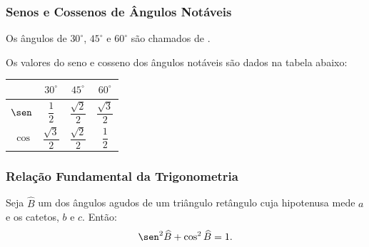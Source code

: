 
\begin{frame}
\frametitle{Senos e Cossenos de Ângulos Notáveis} 

\begin{definicao}
	Os ângulos de $30^\circ$, $45^\circ$ e $60^\circ$ são chamados de  .
\end{definicao}

\begin{exemplo}
	Os valores do seno e cosseno dos ângulos notáveis são dados na tabela abaixo:
	\begin{center}
		\begin{tabular}{r | c c c}
				& $30^\circ$ & $45^\circ$ & $60^\circ$ \\
		\hline
		$\sen$  & $\dfrac 1 2$ & $\dfrac {\sqrt 2} 2$ & $\dfrac {\sqrt 3} 2$   \\
		$\cos$  & $\dfrac {\sqrt 3} 2$ & $\dfrac {\sqrt 2} 2$ &  $\dfrac 1 2$  		
		\end{tabular}
	\end{center}
\end{exemplo}


\end{frame}


\begin{frame}
\frametitle{Relação Fundamental da Trigonometria} 

\begin{proposicao}
Seja $\widehat B$ um dos ângulos agudos de um triângulo retângulo
cuja hipotenusa mede $a$ e os catetos, $b$ e $c$. Então:
$$\sen^2 \widehat B + \cos^2 \widehat B = 1.$$
\end{proposicao}
\end{frame}

